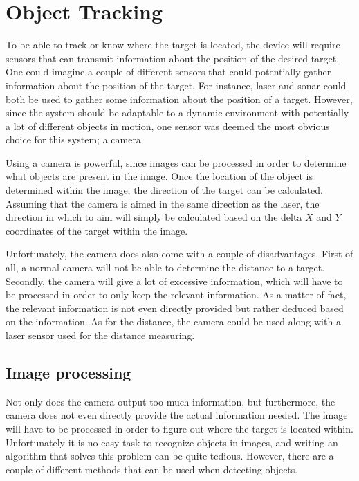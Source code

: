 \section{Object Tracking}
\label{sec:obj_tracking}

To be able to track or know where the target is located, the device will require sensors that can transmit information about the position of the desired target.
One could imagine a couple of different sensors that could potentially gather information about the position of the target.
For instance, laser and sonar could both be used to gather some information about the position of a target\cite{Sensors}.
However, since the system should be adaptable to a dynamic environment with potentially a lot of different objects in motion, one sensor was deemed the most obvious choice for this system; a camera.

Using a camera is powerful, since images can be processed in order to determine what objects are present in the image.
Once the location of the object is determined within the image, the direction of the target can be calculated.
Assuming that the camera is aimed in the same direction as the laser, the direction in which to aim will simply be calculated based on the delta $X$ and $Y$ coordinates of the target within the image.

Unfortunately, the camera does also come with a couple of disadvantages.
First of all, a normal camera will not be able to determine the distance to a target.
Secondly, the camera will give a lot of excessive information, which will have to be processed in order to only keep the relevant information. 
As a matter of fact, the relevant information is not even directly provided but rather deduced based on the information.
As for the distance, the camera could be used along with a laser sensor used for the distance measuring\cite{Sensors}.

\subsection{Image processing}
Not only does the camera output too much information, but furthermore, the camera does not even directly provide the actual information needed.
The image will have to be processed in order to figure out where the target is located within.
Unfortunately it is no easy task to recognize objects in images, and writing an algorithm that solves this problem can be quite tedious.
However, there are a couple of different methods that can be used when detecting objects.


